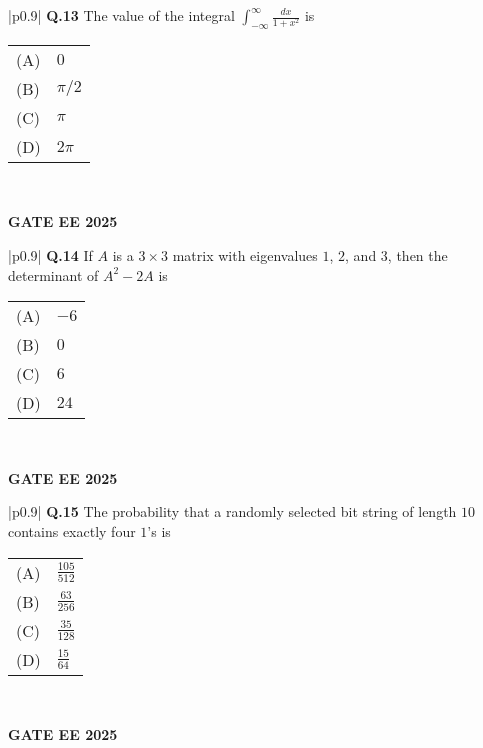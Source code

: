 \documentclass{article}
\begin{document}
\begin{table}[h]
\centering
\begin{tabular}{|p{0.9\linewidth}|}
\hline
\textbf{Q.13} The value of the integral $\int_{-\infty}^{\infty} \frac{dx}{1 + x^2}$ is \\
\hline
\begin{tabular}{ll}
(A) & $0$ \\
(B) & $\pi/2$ \\
(C) & $\pi$ \\
(D) & $2\pi$ \\
\end{tabular} \\
\hline
\end{tabular}
\end{table}
\textbf{GATE EE 2025}

\begin{table}[h]
\centering
\begin{tabular}{|p{0.9\linewidth}|}
\hline
\textbf{Q.14} If $A$ is a $3 \times 3$ matrix with eigenvalues $1$, $2$, and $3$, then the determinant of $A^2 - 2A$ is \\
\hline
\begin{tabular}{ll}
(A) & $-6$ \\
(B) & $0$ \\
(C) & $6$ \\
(D) & $24$ \\
\end{tabular} \\
\hline
\end{tabular}
\end{table}
\textbf{GATE EE 2025}

\begin{table}[h]
\centering
\begin{tabular}{|p{0.9\linewidth}|}
\hline
\textbf{Q.15} The probability that a randomly selected bit string of length $10$ contains exactly four $1$'s is \\
\hline
\begin{tabular}{ll}
(A) & $\frac{105}{512}$ \\
(B) & $\frac{63}{256}$ \\
(C) & $\frac{35}{128}$ \\
(D) & $\frac{15}{64}$ \\
\end{tabular} \\
\hline
\end{tabular}
\end{table}
\textbf{GATE EE 2025}
\end{document}
